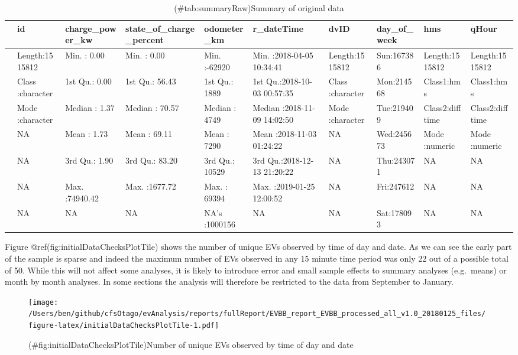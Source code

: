 \documentclass[]{article}
\begin{document}
\begin{table}[t]

\caption{(\#tab:summaryRaw)Summary of original data}
\centering
\begin{tabular}{l|l|l|l|l|l|l|l|l|l}
\hline
  &      id & charge\_power\_kw & state\_of\_charge\_percent &  odometer\_km &   r\_dateTime &     dvID & day\_of\_week &     hms &    qHour\\
\hline
 & Length:1515812 & Min.   :    0.00 & Min.   :   0.00 & Min.   :-62920 & Min.   :2018-04-05 10:34:41 & Length:1515812 & Sun:167386 & Length:1515812 & Length:1515812\\
\hline
 & Class :character & 1st Qu.:    0.00 & 1st Qu.:  56.43 & 1st Qu.:  1889 & 1st Qu.:2018-10-03 00:57:35 & Class :character & Mon:214568 & Class1:hms & Class1:hms\\
\hline
 & Mode  :character & Median :    1.37 & Median :  70.57 & Median :  4749 & Median :2018-11-09 14:02:50 & Mode  :character & Tue:219409 & Class2:difftime & Class2:difftime\\
\hline
 & NA & Mean   :    1.73 & Mean   :  69.11 & Mean   :  7290 & Mean   :2018-11-03 01:24:22 & NA & Wed:245673 & Mode  :numeric & Mode  :numeric\\
\hline
 & NA & 3rd Qu.:    1.90 & 3rd Qu.:  83.20 & 3rd Qu.: 10529 & 3rd Qu.:2018-12-13 21:20:22 & NA & Thu:243071 & NA & NA\\
\hline
 & NA & Max.   :74940.42 & Max.   :1677.72 & Max.   : 69394 & Max.   :2019-01-25 12:00:52 & NA & Fri:247612 & NA & NA\\
\hline
 & NA & NA & NA & NA's   :1000156 & NA & NA & Sat:178093 & NA & NA\\
\hline
\end{tabular}
\end{table}

Figure @ref(fig:initialDataChecksPlotTile) shows the number of unique EVs observed by time of day and date. As we can see the early part of the sample is sparse and indeed the maximum number of EVs observed in any 15 minute time period was only 22 out of a possible total of 50. While this will not affect some analyses, it is likely to introduce error and small sample effects to summary analyses (e.g.~means) or month by month analyses. In some sections the analysis will therefore be restricted to the data from September to January.

\begin{figure}
\centering
\texttt{[image: /Users/ben/github/cfsOtago/evAnalysis/reports/fullReport/EVBB\_report\_EVBB\_processed\_all\_v1.0\_20180125\_files/figure-latex/initialDataChecksPlotTile-1.pdf]}
\caption{(\#fig:initialDataChecksPlotTile)Number of unique EVs observed by time of day and date}
\end{figure}
\end{document}
